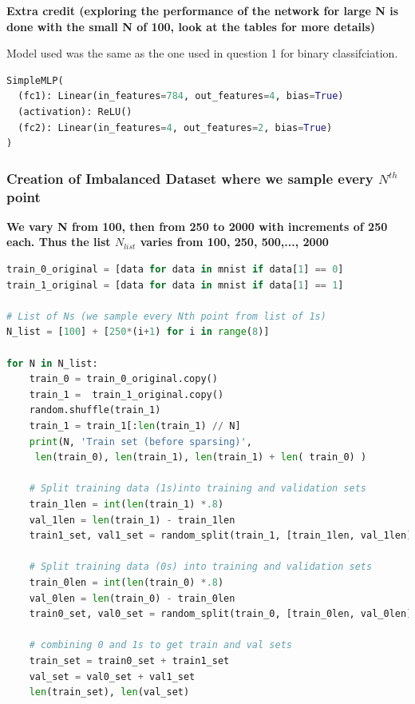 \begin{solve}

    \textbf{
    Extra credit (exploring the performance of the network for large N is done with the small N of 100, look at the tables for more details) }

    Model used was the same as the one used in question 1 for binary classifciation.

    \begin{lstlisting}[language=python]
SimpleMLP(
  (fc1): Linear(in_features=784, out_features=4, bias=True)
  (activation): ReLU()
  (fc2): Linear(in_features=4, out_features=2, bias=True)
)
\end{lstlisting}

    \subsubsection{Creation of Imbalanced Dataset where we sample every $N^{th}$ point}
    
    \textbf{We vary N from 100, then from 250 to 2000 with increments of 250 each. Thus the list $N_{list}$ varies from 100, 250, 500,..., 2000}

    \begin{lstlisting}[language=python]
train_0_original = [data for data in mnist if data[1] == 0]
train_1_original = [data for data in mnist if data[1] == 1]

# List of Ns (we sample every Nth point from list of 1s)
N_list = [100] + [250*(i+1) for i in range(8)]

for N in N_list:
    train_0 = train_0_original.copy()
    train_1 =  train_1_original.copy()
    random.shuffle(train_1)
    train_1 = train_1[:len(train_1) // N]
    print(N, 'Train set (before sparsing)',
     len(train_0), len(train_1), len(train_1) + len( train_0) )

    # Split training data (1s)into training and validation sets
    train_1len = int(len(train_1) *.8)
    val_1len = len(train_1) - train_1len
    train1_set, val1_set = random_split(train_1, [train_1len, val_1len])

    # Split training data (0s) into training and validation sets
    train_0len = int(len(train_0) *.8)
    val_0len = len(train_0) - train_0len
    train0_set, val0_set = random_split(train_0, [train_0len, val_0len])

    # combining 0 and 1s to get train and val sets
    train_set = train0_set + train1_set
    val_set = val0_set + val1_set
    len(train_set), len(val_set)


\end{lstlisting}
\end{solve}
